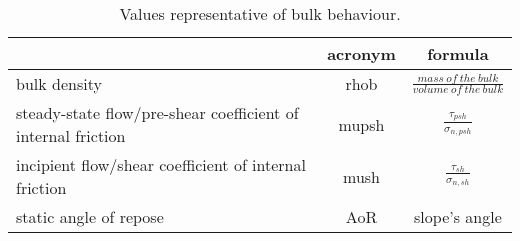 \begin{table}[h]
  \centering
    \begin{tabular}{lcc}
    \hline
     & acronym & formula \\ 
     \hline
    bulk density & \acs{rhob} & $\frac{mass ~ of ~ the ~ bulk}{volume ~ of ~ the
    ~ bulk}$ \\
    [5pt]
     
    steady-state flow/pre-shear coefficient of internal friction & \acs{mupsh}
     & $\frac{\tau_{psh}}{\sigma_{n,psh}}$ \\      [5pt]
     
    incipient flow/shear coefficient of internal friction & \acs{mush} &
    $\frac{\tau_{sh}}{\sigma_{n,sh}}$ \\      [5pt]
     
    static angle of repose & \acs{AoR}   & slope's angle \\
\hline
    
    \end{tabular}%
  \caption{Values representative of bulk behaviour.}
\label{tab:14bulkvalues}
\end{table}%